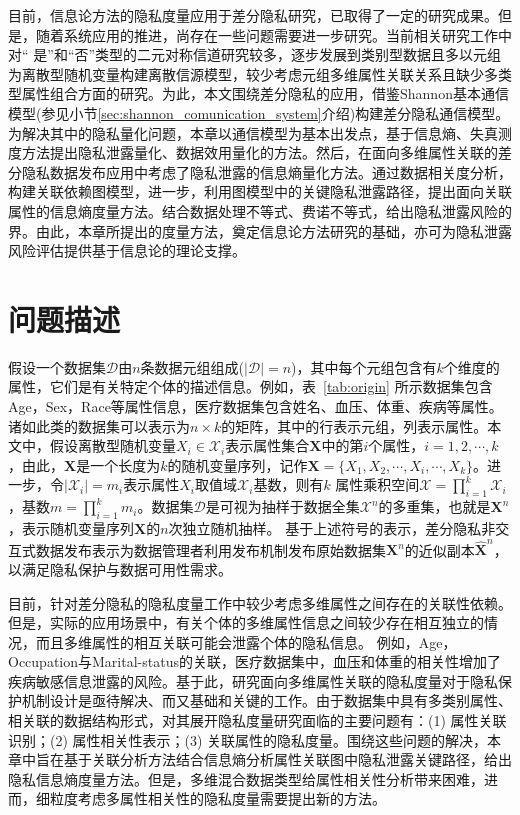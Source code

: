 目前，信息论方法的隐私度量应用于差分隐私研究，已取得了一定的研究成果。但是，随着系统应用的推进，尚存在一些问题需要进一步研究。当前相关研究工作中对`` 是''和``否''类型的二元对称信道研究较多，逐步发展到类别型数据且多以元组为离散型随机变量构建离散信源模型，较少考虑元组多维属性关联关系且缺少多类型属性组合方面的研究。为此，本文围绕差分隐私的应用，借鉴Shannon基本通信模型\cite{shannon1948a}(参见小节\ref{sec:shannon_comunication_system}介绍)构建差分隐私通信模型。为解决其中的隐私量化问题，本章以通信模型为基本出发点，基于信息熵、失真测度方法提出隐私泄露量化、数据效用量化的方法。然后，在面向多维属性关联的差分隐私数据发布应用中考虑了隐私泄露的信息熵量化方法。通过数据相关度分析，构建关联依赖图模型，进一步，利用图模型中的关键隐私泄露路径，提出面向关联属性的信息熵度量方法。结合数据处理不等式、费诺不等式，给出隐私泄露风险的界。由此，本章所提出的度量方法，奠定信息论方法研究的基础，亦可为隐私泄露风险评估提供基于信息论的理论支撑。

 \section{问题描述}
假设一个数据集$\mathcal{D}$由$n$条数据元组组成($|\mathcal{D}|=n$)，其中每个元组包含有$k$个维度的属性，它们是有关特定个体的描述信息。例如，表~\ref{tab:origin} 所示数据集包含Age，Sex，Race等属性信息，医疗数据集包含姓名、血压、体重、疾病等属性。诸如此类的数据集可以表示为$n\times k$的矩阵，其中的行表示元组，列表示属性。本文中，假设离散型随机变量$X_i \in \mathcal{X}_i$表示属性集合$\bm{X}$中的第$i$个属性，$i=1,2,\cdots,k$，由此，$\bm{X}$是一个长度为$k$的随机变量序列，记作$\bm{X}=\{X_1,X_2,\cdots,X_i,\cdots,X_k\}$。进一步，令$|\mathcal{X}_i| = m_i$表示属性$X_i$取值域$\mathcal{X}_i$基数，则有$k$ 属性乘积空间$\mathcal{X}=\prod_{i=1}^{k}\mathcal{X}_i$，基数$m=\prod_{i=1}^{k} m_i$。数据集$\mathcal{D}$是可视为抽样于数据全集$\mathcal{X}^{n}$的多重集，也就是$\bm{X}^{n}$，表示随机变量序列$\bm{X}$的$n$次独立随机抽样。
 基于上述符号的表示，差分隐私非交互式数据发布表示为数据管理者利用发布机制发布原始数据集$\bm{X}^n$的近似副本$\hat{\bm{X}}^n$，以满足隐私保护与数据可用性需求。

目前，针对差分隐私的隐私度量工作中较少考虑多维属性之间存在的关联性依赖。但是，实际的应用场景中，有关个体的多维属性信息之间较少存在相互独立的情况，而且多维属性的相互关联可能会泄露个体的隐私信息。 例如，Age，Occupation与Marital-status的关联，医疗数据集中，血压和体重的相关性增加了疾病敏感信息泄露的风险。基于此，研究面向多维属性关联的隐私度量对于隐私保护机制设计是亟待解决、而又基础和关键的工作。由于数据集中具有多类别属性、相关联的数据结构形式，对其展开隐私度量研究面临的主要问题有：(1) 属性关联识别；(2) 属性相关性表示；(3) 关联属性的隐私度量。围绕这些问题的解决，本章中旨在基于关联分析方法结合信息熵分析属性关联图中隐私泄露关键路径，给出隐私信息熵度量方法。但是，多维混合数据类型给属性相关性分析带来困难，进而，细粒度考虑多属性相关性的隐私度量需要提出新的方法。

